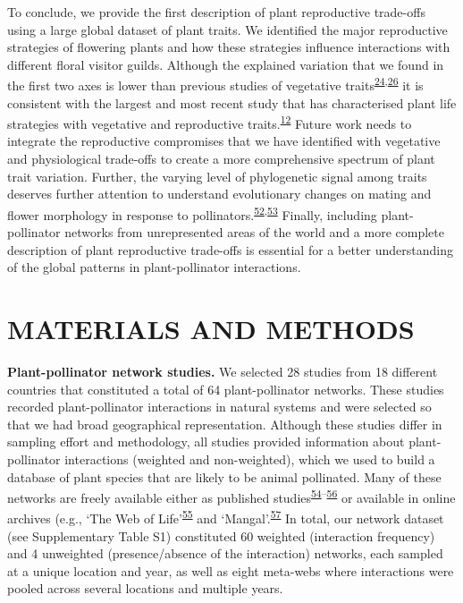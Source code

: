\documentclass[
  12pt,
  a4paper,
]{article}
\begin{document}
To conclude, we provide the first description of plant reproductive trade-offs using a large global dataset of plant traits. We identified the major reproductive strategies of flowering plants and how these strategies influence interactions with different floral visitor guilds. Although the explained variation that we found in the first two axes is lower than previous studies of vegetative traits\textsuperscript{\protect\hyperlink{ref-diaz2016}{24},\protect\hyperlink{ref-carmona2021}{26}} it is consistent with the largest and most recent study that has characterised plant life strategies with vegetative and reproductive traits.\textsuperscript{\protect\hyperlink{ref-salguero2016}{12}} Future work needs to integrate the reproductive compromises that we have identified with vegetative and physiological trade-offs to create a more comprehensive spectrum of plant trait variation. Further, the varying level of phylogenetic signal among traits deserves further attention to understand evolutionary changes on mating and flower morphology in response to pollinators.\textsuperscript{\protect\hyperlink{ref-gervasi2017}{52},\protect\hyperlink{ref-mackin2021}{53}} Finally, including plant-pollinator networks from unrepresented areas of the world and a more complete description of plant reproductive trade-offs is essential for a better understanding of the global patterns in plant-pollinator interactions.

\hypertarget{materials-and-methods}{%
\section{MATERIALS AND METHODS}\label{materials-and-methods}}

\textbf{Plant-pollinator network studies.} We selected 28 studies from 18 different countries that constituted a total of 64 plant-pollinator networks. These studies recorded plant-pollinator interactions in natural systems and were selected so that we had broad geographical representation. Although these studies differ in sampling effort and methodology, all studies provided information about plant-pollinator interactions (weighted and non-weighted), which we used to build a database of plant species that are likely to be animal pollinated. Many of these networks are freely available either as published studies\textsuperscript{\protect\hyperlink{ref-olesen2007}{54}--\protect\hyperlink{ref-carvalheiro2014}{56}} or available in online archives (e.g., `The Web of Life'\textsuperscript{\protect\hyperlink{ref-fortuna2010}{55}} and `Mangal'.\textsuperscript{\protect\hyperlink{ref-poisot2016}{57}} In total, our network dataset (see Supplementary Table S1) constituted 60 weighted (interaction frequency) and 4 unweighted (presence/absence of the interaction) networks, each sampled at a unique location and year, as well as eight meta-webs where interactions were pooled across several locations and multiple years.
\end{document}
